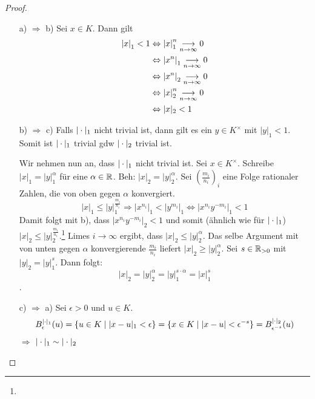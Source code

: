 \documentclass[../main.tex]{subfiles}
\begin{document}
\begin{proof}$ $
    \begin{itemize}
        \item[a) $\Rightarrow$ b)]
        Sei $x\in K$. Dann gilt
        \begin{align*}
            \left\vert x \right\vert_1<1&\Leftrightarrow \left\vert x \right\vert_1^n\underset{n\rightarrow \infty}{\longrightarrow} 0\\
            &\Leftrightarrow \left\vert x^n \right\vert_1 \underset{n\rightarrow \infty}{\longrightarrow} 0\\
            &\Leftrightarrow \left\vert x^n \right\vert_2 \underset{n\rightarrow \infty}{\longrightarrow} 0\\
            &\Leftrightarrow \left\vert x \right\vert_2^n \underset{n\rightarrow \infty}{\longrightarrow} 0\\
            &\Leftrightarrow |x|_2 <1
        \end{align*}
        \item[b) $\Rightarrow$ c)]
        Falls $|\cdot|_1$ nicht trivial ist, dann gilt es ein $y\in K^\times$ mit $|y|_1 <1$.
        Somit ist $|\cdot|_1$ trivial gdw $|\cdot|_2$ trivial ist.
    
        Wir nehmen nun an, dass $|\cdot|_1$ nicht trivial ist.
        Sei $x\in K^\times$. Schreibe $|x|_1 = |y|_1^\alpha$ für eine $\alpha\in \mathbb{R}$.
        Beh: $|x|_2 = |y|_2^\alpha$.
        Sei $(\frac{m_i}{n_i})_i$ eine Folge rationaler Zahlen, die von oben gegen $\alpha$ konvergiert.
        $$|x|_1\leq |y|_1^{\frac{m_i}{n_i}} \Rightarrow |x^{n_i}|_1 < |y^{m_i}|_1 \Leftrightarrow |x^{n_i}y^{-m_i}|_1 <1$$
        Damit folgt mit b), dass $|x^{n_i}y^{-m_i}|_2 <1$ und somit (ähnlich wie für $|\cdot|_1$) $|x|_2\leq |y|_2^{\frac{m_i}{n_i}}$.\footnote{}
        Limes $i\rightarrow\infty$ ergibt, dass $|x|_2\leq |y|_2^\alpha$.
        Das selbe Argument mit von unten gegen $\alpha$ konvergierende $\frac{m_i}{n_i}$ liefert $|x|_2 \geq |y|_2^\alpha$.
        Sei $s\in \mathbb{R}_{>0}$ mit $|y|_2 = |y|_1^s$.
        Dann folgt:
        $$|x|_2 = |y|_2^\alpha = |y|_1^{s\cdot \alpha} = |x|_1^s$$.
        \item[c) $\Rightarrow$ a)]
        Sei $\epsilon >0$ und $u\in K$.
        $$B_\epsilon^{|\cdot|_1}(u) = \{u\in K\mid |x-u|_1<\epsilon\} = \{x\in K\mid |x-u|<\epsilon^{-s}\} = B_{\epsilon^{-s}}^{|\cdot|_2}(u)$$
        $\Longrightarrow$ $|\cdot|_1\sim|\cdot|_2$
    \end{itemize}
\end{proof}
\end{document}
